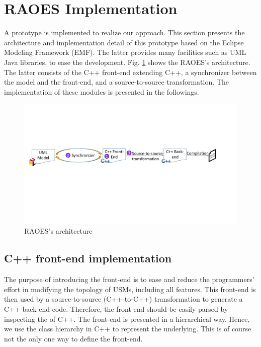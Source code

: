 \section{RAOES Implementation}
\label{sec:implementation}
A prototype is implemented to realize our approach. 
This section presents the architecture and implementation detail of this prototype based on the Eclipse Modeling Framework (EMF).
The latter provides many facilities such as UML Java libraries, to ease the development.
Fig. \ref{fig:architecture} shows the RAOES's architecture.
The latter consists of the C++ front-end extending C++, a synchronizer between the model and the front-end, and a source-to-source transformation.
The implementation of these modules is presented in the followings. 

\begin{figure}
	\centering
	\includegraphics[clip, trim=0.8cm 9.5cm 3.2cm 6.8cm, width=1.0\columnwidth]{figures/architecture.pdf}
	\caption{RAOES's architecture} 
	\label{fig:architecture}
\end{figure}

\subsection{C++ front-end implementation}
The purpose of introducing the front-end is to ease and reduce the programmers' effort in modifying the topology of USMs, including all features.
This front-end is then used by a source-to-source (C++-to-C++) transformation to generate a C++ back-end code.
Therefore, the front-end should be easily parsed by inspecting the  of C++.
The front-end is presented in a hierarchical way.
Hence, we use the class hierarchy in C++ to represent the underlying.
This is of course not the only one way to define the front-end.

